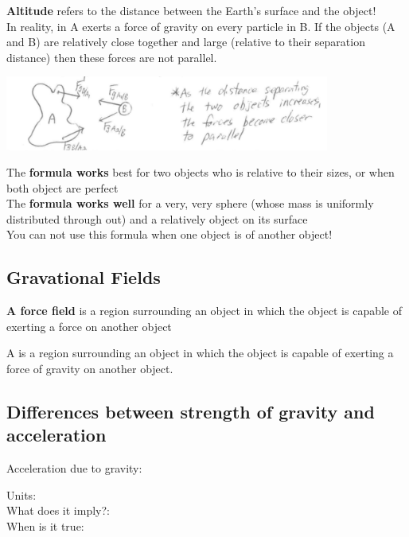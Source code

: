  \textbf{Altitude} refers to the distance between the Earth's surface and the object!\\

In reality,  in A exerts a force of gravity on every particle in B. 
If the objects (A and B) are relatively close together and large (relative to their separation distance)
then these forces are not parallel.
\begin{center}
    \includegraphics[width=0.8\textwidth]{graph/fgparallel.png}
\end{center}

The \textbf{formula works} best for two objects who  is  relative to their sizes, 
or when both object are perfect \\

The \textbf{formula works well} for a very, very  sphere (whose mass is uniformly distributed through out)
and a relatively  object on its surface\\

You can not use this formula when one object is  of another object!

\subsection{Gravational Fields}
\begin{definition}
    \textbf{A force field} is a region surrounding an object in which the object is capable of exerting a force on another object
\end{definition}

A  is a region surrounding an object in which the object is capable of exerting a force of gravity 
on another object.

\subsection{Differences between strength of gravity and acceleration}
Acceleration due to gravity:
\begin{center}
    Units: \\
    What does it imply?:  \\
    When is it true: 
\end{center}

